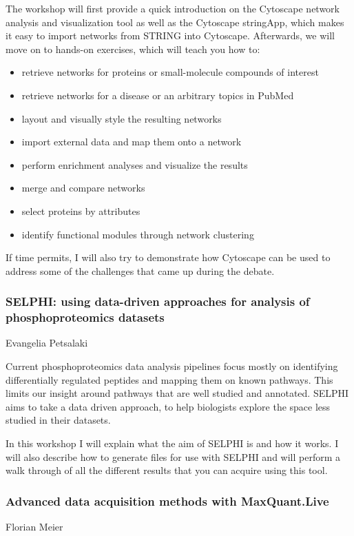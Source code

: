 The workshop will first provide a quick introduction on the Cytoscape network
analysis and visualization tool as well as the Cytoscape stringApp, which makes
it easy to import networks from STRING into Cytoscape. Afterwards, we will move
on to hands-on exercises, which will teach you how to:
\begin{itemize}
  \item retrieve networks for proteins or small-molecule compounds of interest
  \item retrieve networks for a disease or an arbitrary topics in PubMed
  \item layout and visually style the resulting networks
  \item import external data and map them onto a network
  \item perform enrichment analyses and visualize the results
  \item merge and compare networks
  \item select proteins by attributes
  \item identify functional modules through network clustering
\end{itemize}
If time permits, I will also try to demonstrate how Cytoscape can be used to
address some of the challenges that came up during the debate.

\subsubsection*{\color{eubicRed} SELPHI: using data-driven approaches for analysis of phosphoproteomics datasets}
{\color{eubicGray}Evangelia Petsalaki}

Current phosphoproteomics data analysis pipelines focus mostly on identifying
differentially regulated peptides and mapping them on known pathways. This
limits our insight around pathways that are well studied and annotated. SELPHI
aims to take a data driven approach, to help biologists explore the space less
studied in their datasets.

In this workshop I will explain what the aim of SELPHI is and how it works. I
will also describe how to generate files for use with SELPHI and will perform a
walk through of all the different results that you can acquire using this tool.

\subsubsection*{\color{eubicRed} Advanced data acquisition methods with MaxQuant.Live}
{\color{eubicGray}Florian Meier}

